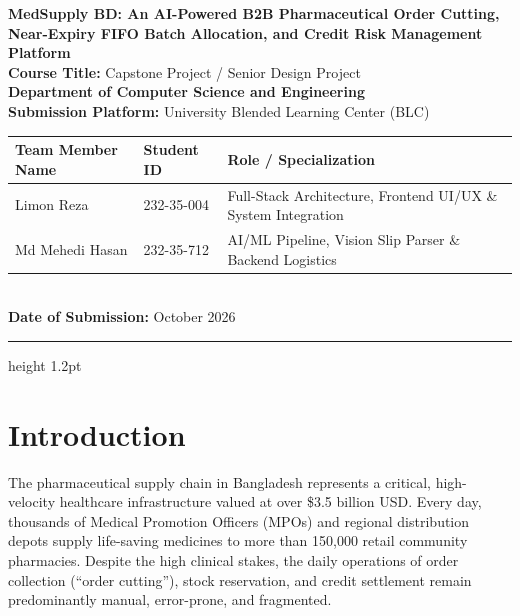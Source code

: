 \documentclass[12pt,a4paper]{article}
\begin{document}
\begin{center}
    {\LARGE \textbf{MedSupply BD: An AI-Powered B2B Pharmaceutical Order Cutting, Near-Expiry FIFO Batch Allocation, and Credit Risk Management Platform}}\\[1.2em]
    
    \textbf{Course Title:} Capstone Project / Senior Design Project \\
    \textbf{Department of Computer Science and Engineering} \\
    \textbf{Submission Platform:} University Blended Learning Center (BLC) \\[1.2em]

    \begin{tabularx}{\textwidth}{p{4cm}p{3cm}X}
        \toprule
        \textbf{Team Member Name} & \textbf{Student ID} & \textbf{Role / Specialization} \\
        \midrule
        Limon Reza & 232-35-004 & Full-Stack Architecture, Frontend UI/UX \& System Integration \\
        Md Mehedi Hasan & 232-35-712 & AI/ML Pipeline, Vision Slip Parser \& Backend Logistics \\
        \bottomrule
    \end{tabularx}
    \\[1em]
    \textbf{Date of Submission:} October 2026
\end{center}

\vspace{0.8em}
\hrule height 1.2pt
\vspace{1.2em}

\section{Introduction}
The pharmaceutical supply chain in Bangladesh represents a critical, high-velocity healthcare infrastructure valued at over \$3.5 billion USD. Every day, thousands of Medical Promotion Officers (MPOs) and regional distribution depots supply life-saving medicines to more than 150,000 retail community pharmacies. Despite the high clinical stakes, the daily operations of order collection (``order cutting''), stock reservation, and credit settlement remain predominantly manual, error-prone, and fragmented. 
\end{document}
